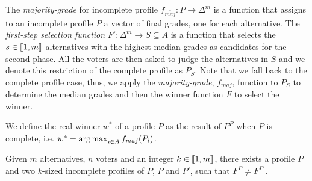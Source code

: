 \documentclass[version=3.21, pagesize, twoside=off, bibliography=totoc, DIV=calc, fontsize=12pt, a4paper]{scrartcl}
\begin{document}
The \emph{majority-grade} for incomplete profile $f_{\bar{maj}}: \bar{P} \rightarrow \Delta^m$ is a function that assigns to an incomplete profile $\bar{P}$ a vector of final grades, one for each alternative. The \emph{first-step selection function} $F':\Delta^{m} \rightarrow S \subseteq A$ is a function that selects the $s \in \llbracket1,m\rrbracket$ alternatives with the highest median grades as candidates for the second phase. All the voters are then asked to judge the alternatives in $S$ and we denote this restriction of the complete profile as $P_{S}$. Note that we fall back to the complete profile case, thus, we apply the \emph{majority-grade}, $f_{maj}$, function to $P_{S}$ to determine the median grades and then the winner function $F$ to select the winner.

\begin{definition}
	We define the real winner $w^*$ of a profile $P$ as the result of $F^P$ when $P$ is complete, i.e. $w^* = \operatorname*{arg\,max}_{i\in A}f_{maj}(P_i)$.
\end{definition}

\begin{proposition}
	\label{prop:notsamewinner}
	Given $m$ alternatives, $n$ voters and an integer $k \in \llbracket1,m\rrbracket$, there exists a profile $P$ and two $k$-sized incomplete profiles of $P$, $\bar{P}$ and $\bar{P}'$, such that $F^{\bar{P}} \neq F^{\bar{P}'}$.
\end{proposition}
\end{document}
